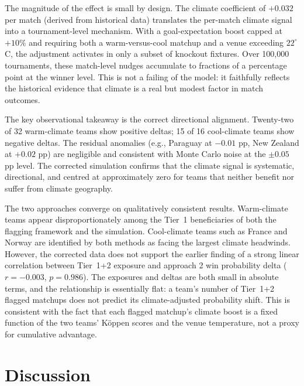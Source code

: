 \documentclass[11pt,a4paper]{article}
\begin{document}
The magnitude of the effect is small by design. The climate coefficient of $+0.032$ per match (derived from historical data) translates the per-match climate signal into a tournament-level mechanism. With a goal-expectation boost capped at $+10\%$ and requiring both a warm-versus-cool matchup and a venue exceeding $22^{\circ}$C, the adjustment activates in only a subset of knockout fixtures. Over 100,000 tournaments, these match-level nudges accumulate to fractions of a percentage point at the winner level. This is not a failing of the model: it faithfully reflects the historical evidence that climate is a real but modest factor in match outcomes.

The key observational takeaway is the correct directional alignment. Twenty-two of 32 warm-climate teams show positive deltas; 15 of 16 cool-climate teams show negative deltas. The residual anomalies (e.g., Paraguay at $-0.01$ pp, New Zealand at $+0.02$ pp) are negligible and consistent with Monte Carlo noise at the $\pm 0.05$ pp level. The corrected simulation confirms that the climate signal is systematic, directional, and centred at approximately zero for teams that neither benefit nor suffer from climate geography.

The two approaches converge on qualitatively consistent results. Warm-climate teams appear disproportionately among the Tier~1 beneficiaries of both the flagging framework and the simulation. Cool-climate teams such as France and Norway are identified by both methods as facing the largest climate headwinds. However, the corrected data does not support the earlier finding of a strong linear correlation between Tier~1+2 exposure and approach 2 win probability delta ($r = -0.003$, $p = 0.986$). The exposures and deltas are both small in absolute terms, and the relationship is essentially flat: a team's number of Tier~1+2 flagged matchups does not predict its climate-adjusted probability shift. This is consistent with the fact that each flagged matchup's climate boost is a fixed function of the two teams' K\"{o}ppen scores and the venue temperature, not a proxy for cumulative advantage.

\newpage

\section{Discussion}
\end{document}

